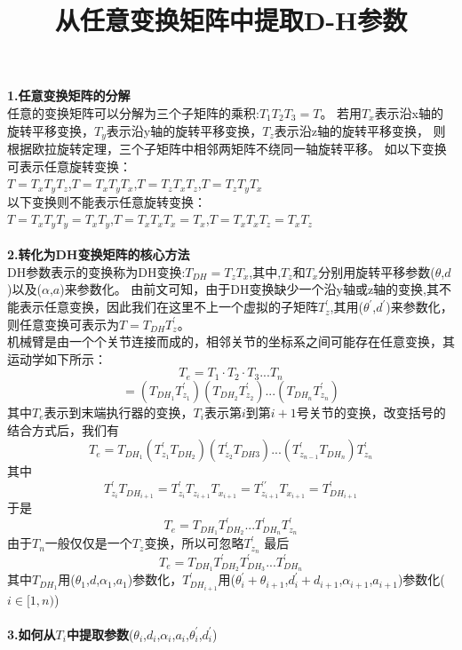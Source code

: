 \documentclass{article}
\begin{document}
\begin{CJK}{UTF8}{song}
\title{从任意变换矩阵中提取D-H参数}
\maketitle
\textbf{1.任意变换矩阵的分解}\\
任意的变换矩阵可以分解为三个子矩阵的乘积:$T_1T_2T_3=T$。
若用$T_x$表示沿x轴的旋转平移变换，$T_y$表示沿y轴的旋转平移变换，$T_z$表示沿z轴的旋转平移变换，
则根据欧拉旋转定理，三个子矩阵中相邻两矩阵不绕同一轴旋转平移。
如以下变换可表示任意旋转变换：\\
$T=T_xT_yT_z$,\qquad$T=T_xT_yT_x$,\qquad$T=T_zT_xT_z$,\qquad$T=T_zT_yT_x$\\
以下变换则不能表示任意旋转变换：\\
$T=T_xT_yT_y=T_xT_y$,\qquad$T=T_xT_xT_x=T_x$,\qquad$T=T_xT_xT_z=T_xT_z$\\
\\
\textbf{2.转化为DH变换矩阵的核心方法}\\
DH参数表示的变换称为DH变换:$T_{DH}=T_zT_x$,其中,$T_z$和$T_x$分别用旋转平移参数($\theta$,$d$)以及($\alpha$,$a$)来参数化。
由前文可知，由于DH变换缺少一个沿y轴或z轴的变换,其不能表示任意变换，因此我们在这里不上一个虚拟的子矩阵$T_z^\prime$,其用($\theta^\prime$,$d^\prime$)来参数化，则任意变换可表示为$T=T_{DH}T_z^\prime$。\\
机械臂是由一个个关节连接而成的，相邻关节的坐标系之间可能存在任意变换，其运动学如下所示：\\
$$T_e=T_1\cdot T_2\cdot T_3 ... T_n$$
$$=(T_{DH_1}T_{z_1}^\prime)(T_{DH_2}T_{z_2}^\prime) ... (T_{DH_n}T_{z_n}^\prime)$$
其中$T_e$表示到末端执行器的变换，$T_i$表示第$i$到第$i+1$号关节的变换，改变括号的结合方式后，我们有
$$T_e=T_{DH_1}(T_{z_1}^\prime T_{DH_2})(T_{z_2}^\prime T_{DH3}) ... (T_{z_{n-1}}^\prime T_{DH_n})T_{z_n}^\prime$$
其中
$$T_{z_i}^\prime T_{DH_{i+1}}=T_{z_i}^\prime T_{z_{i+1}}T_{x_{i+1}}=T_{z_{i+1}}^{\prime\prime} T_{x_{i+1}}=T_{DH_{i+1}}^\prime$$
于是
$$T_e=T_{DH_1}T_{DH_2}^\prime ... T_{DH_n}^\prime T_{z_n}^\prime$$
由于$T_n$一般仅仅是一个$T_z$变换，所以可忽略$T_{z_n}^\prime$
最后
$$T_e=T_{DH_1}T_{DH_2}^\prime T_{DH_3}^\prime ... T_{DH_n}^\prime$$
其中$T_{DH_1}$用($\theta_1$,$d$,$\alpha_1$,$a_1$)参数化，$T_{DH_{i+1}}^\prime$用($\theta_i^\prime+\theta_{i+1}$,$d_i^\prime+d_{i+1}$,$\alpha_{i+1}$,$a_{i+1}$)参数化($i \in [1,n)$)\\
\\
\textbf{3.如何从$T_i$中提取参数}($\theta_i$,$d_i$,$\alpha_i$,$a_i$,$\theta^\prime_i$,$d^\prime_i$)\\

\end{CJK}
\end{document}

